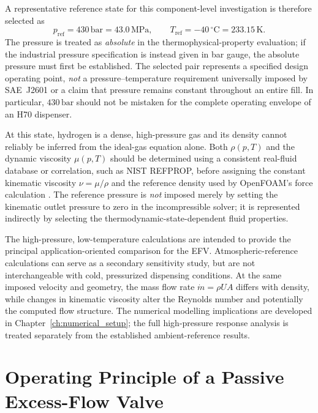 A representative reference state for this component-level investigation is therefore selected as
\begin{equation}
  p_{\mathrm{ref}}=430\,\mathrm{bar}=43.0\,\mathrm{MPa},
  \qquad
  T_{\mathrm{ref}}=-40\,^{\circ}\mathrm{C}=233.15\,\mathrm{K}.
  \label{eq:efv_reference_state}
\end{equation}
The pressure is treated as \emph{absolute} in the thermophysical-property evaluation; if the industrial pressure specification is instead given in bar gauge, the absolute pressure must first be established. The selected pair represents a specified design operating point, \emph{not} a pressure--temperature requirement universally imposed by SAE~J2601 or a claim that pressure remains constant throughout an entire fill. In particular, $430\,\mathrm{bar}$ should not be mistaken for the complete operating envelope of an H70 dispenser.

At this state, hydrogen is a dense, high-pressure gas and its density cannot reliably be inferred from the ideal-gas equation alone. Both $\rho(p,T)$ and the dynamic viscosity $\mu(p,T)$ should be determined using a consistent real-fluid database or correlation, such as NIST REFPROP, before assigning the constant kinematic viscosity $\nu=\mu/\rho$ and the reference density used by OpenFOAM's force calculation \cite{nist_refprop,nist_refprop_online}. The reference pressure is \emph{not} imposed merely by setting the kinematic outlet pressure to zero in the incompressible solver; it is represented indirectly by selecting the thermodynamic-state-dependent fluid properties.

The high-pressure, low-temperature calculations are intended to provide the principal application-oriented comparison for the EFV. Atmospheric-reference calculations can serve as a secondary sensitivity study, but are not interchangeable with cold, pressurized dispensing conditions. At the same imposed velocity and geometry, the mass flow rate $\dot m=\rho U A$ differs with density, while changes in kinematic viscosity alter the Reynolds number and potentially the computed flow structure. The numerical modelling implications are developed in Chapter~\ref{ch:numerical_setup}; the full high-pressure response analysis is treated separately from the established ambient-reference results.

\section{Operating Principle of a Passive Excess-Flow Valve}
\label{sec:efv_principle}


